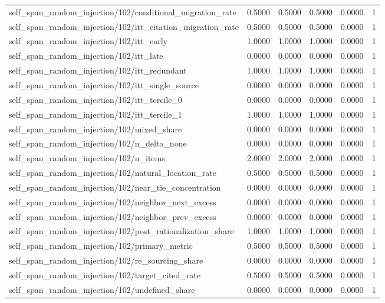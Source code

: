 \begin{table}[h]
\begin{tabular}{lrrrrr}
self_span_random_injection/102/conditional_migration_rate & 0.5000 & 0.5000 & 0.5000 & 0.0000 & 1 \\
self_span_random_injection/102/itt_citation_migration_rate & 0.5000 & 0.5000 & 0.5000 & 0.0000 & 1 \\
self_span_random_injection/102/itt_early & 1.0000 & 1.0000 & 1.0000 & 0.0000 & 1 \\
self_span_random_injection/102/itt_late & 0.0000 & 0.0000 & 0.0000 & 0.0000 & 1 \\
self_span_random_injection/102/itt_redundant & 1.0000 & 1.0000 & 1.0000 & 0.0000 & 1 \\
self_span_random_injection/102/itt_single_source & 0.0000 & 0.0000 & 0.0000 & 0.0000 & 1 \\
self_span_random_injection/102/itt_tercile_0 & 0.0000 & 0.0000 & 0.0000 & 0.0000 & 1 \\
self_span_random_injection/102/itt_tercile_1 & 1.0000 & 1.0000 & 1.0000 & 0.0000 & 1 \\
self_span_random_injection/102/mixed_share & 0.0000 & 0.0000 & 0.0000 & 0.0000 & 1 \\
self_span_random_injection/102/n_delta_none & 0.0000 & 0.0000 & 0.0000 & 0.0000 & 1 \\
self_span_random_injection/102/n_items & 2.0000 & 2.0000 & 2.0000 & 0.0000 & 1 \\
self_span_random_injection/102/natural_location_rate & 0.5000 & 0.5000 & 0.5000 & 0.0000 & 1 \\
self_span_random_injection/102/near_tie_concentration & 0.0000 & 0.0000 & 0.0000 & 0.0000 & 1 \\
self_span_random_injection/102/neighbor_next_excess & 0.0000 & 0.0000 & 0.0000 & 0.0000 & 1 \\
self_span_random_injection/102/neighbor_prev_excess & 0.0000 & 0.0000 & 0.0000 & 0.0000 & 1 \\
self_span_random_injection/102/post_rationalization_share & 1.0000 & 1.0000 & 1.0000 & 0.0000 & 1 \\
self_span_random_injection/102/primary_metric & 0.5000 & 0.5000 & 0.5000 & 0.0000 & 1 \\
self_span_random_injection/102/re_sourcing_share & 0.0000 & 0.0000 & 0.0000 & 0.0000 & 1 \\
self_span_random_injection/102/target_cited_rate & 0.5000 & 0.5000 & 0.5000 & 0.0000 & 1 \\
self_span_random_injection/102/undefined_share & 0.0000 & 0.0000 & 0.0000 & 0.0000 & 1 \\

\end{tabular}
\end{table}
